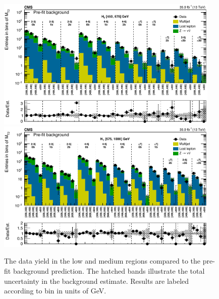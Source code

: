 \begin{figure}
	\centering
	\includegraphics[width=0.95\textwidth]{results/figs/mt2_lowHT_fullEstimate}
	\includegraphics[width=0.95\textwidth]{results/figs/mt2_mediumHT_fullEstimate}
	\renewcommand{\baselinestretch}{1.0}
	\caption[The data yield in the low \HT and medium \HT regions compared to the pre-fit background prediction.]{The data yield in the low \HT and medium \HT regions compared to the pre-fit background prediction. The hatched bands illustrate the total uncertainty in the background estimate. Results are labeled according to \mttwo bin in units of GeV.}
	\label{fig:yieldPrefit2}
\end{figure}
